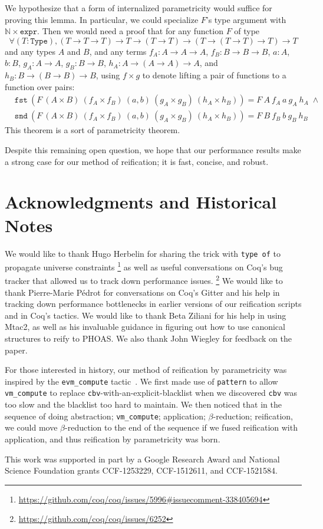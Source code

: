 We hypothesize that a form of internalized parametricity would suffice for proving this lemma.
In particular, we could specialize $F$'s type argument with $\mathbb N \times \texttt{expr}$.
Then we would need a proof that for any function $F$ of type
\[
\forall (T : \texttt{Type}), (T \to T \to T) \to T \to (T \to T) \to (T \to (T \to T) \to T) \to T
\]
and any types $A$ and $B$, and any terms $f_A : A \to A \to A$, $f_B : B \to B\to B$, $a : A$, $b : B$, $g_A : A \to A$, $g_B : B \to B$, $h_A : A \to (A \to A) \to A$, and $h_B : B \to (B \to B) \to B$, using $f\times g$ to denote lifting a pair of functions to a function over pairs:
\begin{align*}
  & \texttt{fst}\ \left(F\ (A \times B)\ (f_A \times f_B)\ (a, b)\ (g_A \times g_B)\ (h_A \times h_B)\right) = F\ A\ f_A\ a\ g_A\ h_A \;\wedge \\
  & \texttt{snd}\ \left(F\ (A \times B)\ (f_A \times f_B)\ (a, b)\ (g_A \times g_B)\ (h_A \times h_B)\right) = F\ B\ f_B\ b\ g_B\ h_B
\end{align*}
This theorem is a sort of parametricity theorem.

Despite this remaining open question, we hope that our performance results make a strong case for our method of reification; it is fast, concise, and robust.

\section{Acknowledgments and Historical Notes}

We would like to thank Hugo Herbelin for sharing the trick with \texttt{type of} to propagate universe constraints%
\footnote{%
    \url{https://github.com/coq/coq/issues/5996\#issuecomment-338405694}%
}
as well as useful conversations on Coq's bug tracker that allowed us to track down performance issues.%
\footnote{%
    \url{https://github.com/coq/coq/issues/6252}%
}
We would like to thank Pierre-Marie P\'edrot for conversations on Coq's Gitter and his help in tracking down performance bottlenecks in earlier versions of our reification scripts and in Coq's tactics.
We would like to thank Beta Ziliani for his help in using Mtac2, as well as his invaluable guidance in figuring out how to use canonical structures to reify to PHOAS.
We also thank John Wiegley for feedback on the paper.

For those interested in history, our method of reification by parametricity was inspired by the \texttt{evm\_compute} tactic~\cite{MirrorShardITP14}.
We first made use of \texttt{pattern} to allow \texttt{vm\_compute} to replace \texttt{cbv}-with-an-explicit-blacklist when we discovered \texttt{cbv} was too slow and the blacklist too hard to maintain.
We then noticed that in the sequence of doing abstraction; \texttt{vm\_compute}; application; $\beta$-reduction; reification, we could move $\beta$-reduction to the end of the sequence if we fused reification with application, and thus reification by parametricity was born.

This work was supported in part by a Google Research Award and National Science Foundation grants CCF-1253229, CCF-1512611, and CCF-1521584.

